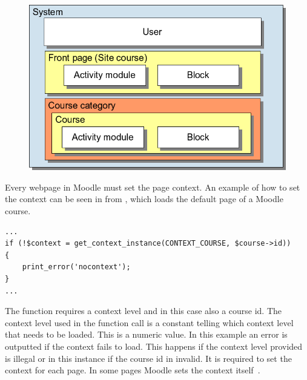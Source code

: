  \begin{figure}
	 \centering
		 \includegraphics[width=\textwidth]{images/moodle-contexts.png}
	 \label{fig:moodlecontexts}
 \end{figure}


Every webpage in Moodle must set the page context. 
An example of how to set the context can be seen in  from , which loads the default page of a Moodle course.

\begin{lstlisting}[style=phpCode, caption=\myCaption{Code snippet from \moodlefile{/course/view.php} showing how the context of a course is set}, label=courseviewcontextsnippet]
...
if (!$context = get_context_instance(CONTEXT_COURSE, $course->id))
{
	print_error('nocontext');
}
...
\end{lstlisting}
The function  requires a context level and in this case also a course id. 
The context level used in the function call is a constant telling which context level that needs to be loaded. 
This is a numeric value. 
In this example an error is outputted if the context fails to load. 
This happens if the context level provided is illegal or in this instance if the course id in invalid.
It is required to set the context for each page. 
In some pages Moodle sets the context itself~\cite{moodlepageapi}. 


